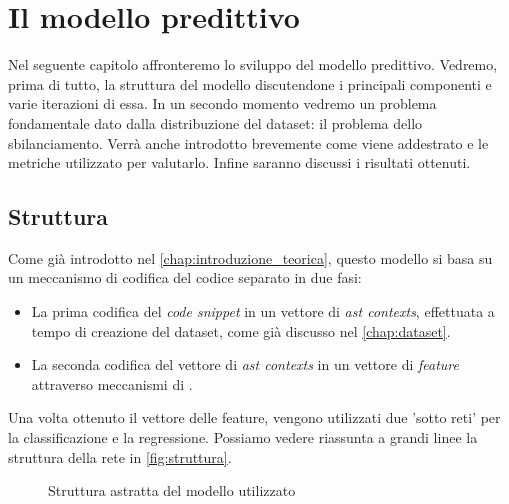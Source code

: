 \chapter{Il modello predittivo}\label{chap:modello}
Nel seguente capitolo affronteremo lo sviluppo del modello predittivo. 
Vedremo, prima di tutto, la struttura del modello discutendone i principali componenti e varie iterazioni di essa.  
In un secondo momento vedremo un problema fondamentale dato dalla distribuzione del dataset: il problema dello sbilanciamento.
Verrà anche introdotto brevemente come viene addestrato e le metriche utilizzato per valutarlo.
Infine saranno discussi i risultati ottenuti. 

\section{Struttura}
Come già introdotto nel \autoref{chap:introduzione_teorica}, questo modello si basa su un meccanismo di codifica del codice separato in due fasi:
    \begin{itemize}
        \item La prima codifica del \textit{code snippet} in un vettore di \textit{ast contexts}, effettuata a tempo di creazione del dataset, come già discusso nel \autoref{chap:dataset}.
        \item La seconda codifica del vettore di \textit{ast contexts} in un vettore di \textit{feature} attraverso meccanismi di \DL.
    \end{itemize}
Una volta ottenuto il vettore delle feature, vengono utilizzati due 'sotto reti' per la classificazione e la regressione. 
Possiamo vedere riassunta a grandi linee la struttura della rete in \autoref{fig:struttura}.

\begin{figure}[h]
    \centering
      \caption{Struttura astratta del modello utilizzato}
      \label{fig:struttura}
\end{figure}

